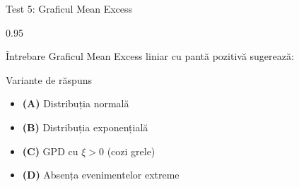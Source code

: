 \documentclass[9pt, aspectratio=169, t]{beamer}
\begin{document}
\begin{frame}{Test 5: Graficul Mean Excess}
    \begin{cminipage}{0.95\textwidth}
    \begin{alertblock}{Întrebare}
        Graficul Mean Excess liniar cu pantă pozitivă sugerează:
    \end{alertblock}
    \begin{block}{Variante de răspuns}
    \begin{itemize}\setlength{\itemsep}{0pt}
        \item \textcolor{MainBlue}{\textbf{(A)}} Distribuția normală
        \item \textcolor{MainBlue}{\textbf{(B)}} Distribuția exponențială
        \item \textcolor{MainBlue}{\textbf{(C)}} GPD cu $\xi > 0$ (cozi grele)
        \item \textcolor{MainBlue}{\textbf{(D)}} Absența evenimentelor extreme
    \end{itemize}
    \end{block}
    \end{cminipage}
\end{frame}
\end{document}
